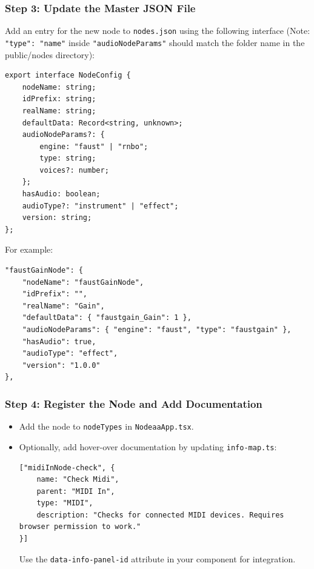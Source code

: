 \documentclass[10pt,twocolumn]{article}
\begin{document}
\subsubsection{Step 3: Update the Master JSON File}
Add an entry for the new node to \texttt{nodes.json} using the following interface (Note: \texttt{"type": "name"} inside \texttt{"audioNodeParams"} should match the folder name in the public/nodes directory):
\begin{lstlisting}
export interface NodeConfig {
    nodeName: string;
    idPrefix: string;
    realName: string;
    defaultData: Record<string, unknown>;
    audioNodeParams?: {
        engine: "faust" | "rnbo";
        type: string;
        voices?: number;
    };
    hasAudio: boolean;
    audioType?: "instrument" | "effect";
    version: string;
};
\end{lstlisting}
For example:
\begin{lstlisting}
"faustGainNode": {
    "nodeName": "faustGainNode",
    "idPrefix": "",
    "realName": "Gain",
    "defaultData": { "faustgain_Gain": 1 },
    "audioNodeParams": { "engine": "faust", "type": "faustgain" },
    "hasAudio": true,
    "audioType": "effect",
    "version": "1.0.0"
},
\end{lstlisting}

\subsubsection{Step 4: Register the Node and Add Documentation}
\begin{itemize}
    \item Add the node to \texttt{nodeTypes} in \texttt{NodeaaApp.tsx}.
    \item Optionally, add hover-over documentation by updating \texttt{info-map.ts}:
\begin{lstlisting}
["midiInNode-check", {
    name: "Check Midi",
    parent: "MIDI In",
    type: "MIDI",
    description: "Checks for connected MIDI devices. Requires browser permission to work."
}]
\end{lstlisting}
    Use the \texttt{data-info-panel-id} attribute in your component for integration.
\end{itemize}
\end{document}
